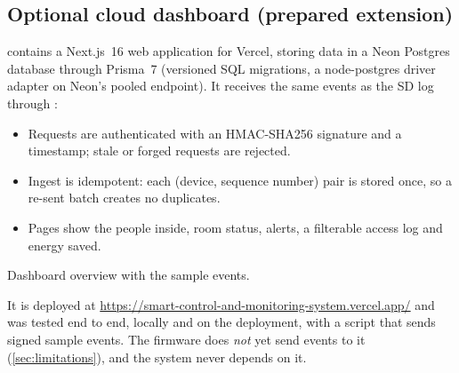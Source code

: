 \subsection{Optional cloud dashboard (prepared extension)}
 contains a Next.js~16 web application for Vercel, storing data in a Neon
Postgres database through Prisma~7 (versioned SQL migrations, a node-postgres driver adapter on
Neon's pooled endpoint). It receives the same events as the SD log through
:
\begin{itemize}
  \item Requests are authenticated with an HMAC-SHA256 signature and a timestamp; stale or forged
        requests are rejected.
  \item Ingest is idempotent: each (device, sequence number) pair is stored once, so a re-sent
        batch creates no duplicates.
  \item Pages show the people inside, room status, alerts, a filterable access log and energy
        saved.
\end{itemize}
  {Dashboard overview with the sample events.}

It is deployed at \url{https://smart-control-and-monitoring-system.vercel.app/} and was tested
end to end, locally and on the deployment, with a script that sends signed sample events. The
firmware does
\emph{not} yet send events to it (\cref{sec:limitations}), and the system never depends on it.
